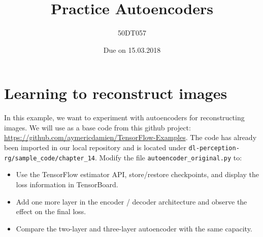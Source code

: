 \documentclass[savetrees,12pt]{article}
\begin{document}
\title{Practice Autoencoders}
\author{50DT057}
\date{Due on 15.03.2018}
\maketitle

\section{Learning to reconstruct images}
In this example, we want to experiment with autoencoders for reconstructing images. We will use as a base code from this github project: \url{https://github.com/aymericdamien/TensorFlow-Examples}.
The code has already been imported in our local repository and is located under \verb+dl-perception-rg/sample_code/chapter_14+.
Modify the file \verb+autoencoder_original.py+ to:

\begin{itemize}
\item Use the TensorFlow estimator API, store/restore checkpoints, and display the loss information in TensorBoard.
\item Add one more layer in the encoder / decoder architecture and observe the effect on the final loss. 
\item Compare the two-layer and three-layer autoencoder with the same capacity.
\end{itemize}
\end{document}
